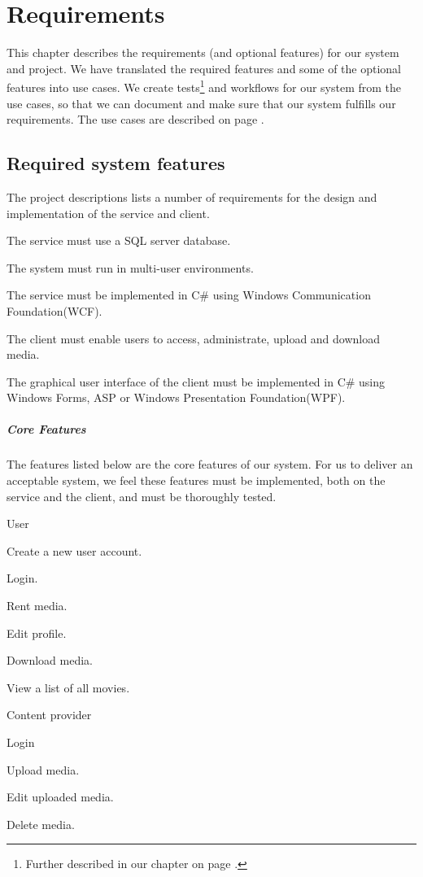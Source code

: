 \chapter{Requirements}
\label{Requirements}
This chapter describes the requirements (and optional features) for our system and project. We have translated the required features and some of the optional features into use cases. We create tests\footnote{Further described in our  chapter on page \pageref{Testing}.} and workflows for our system from the use cases, so that we can document and make sure that our system fulfills our requirements. The use cases are described on page \pageref{Requirements_UC}.

\section{Required system features}
\label{Requirements_Rfeatures}
The project descriptions lists a number of requirements for the design and implementation of the service and client.
\begin{my_itemize}
\item The service must use a SQL server database.
\item The system must run in multi-user environments.
\item The service must be implemented in C\# using Windows Communication Foundation(WCF).
\item The client must enable users to access, administrate, upload and download media.
\item The graphical user interface of the client must be implemented in C\# using Windows Forms, ASP or Windows Presentation Foundation(WPF).
\end{my_itemize}

\paragraph{Core Features}
The features listed below are the core features of our system. For us to deliver an acceptable system, we feel these features must be implemented, both on the service and the client, and must be thoroughly tested. 
\begin{my_itemize}
	\item User
	\begin{my_itemize}
		\item Create a new user account.
		\item Login.
		\item Rent media.
		\item Edit profile.
		\item Download media.
		\item View a list of all movies.
	\end{my_itemize}
	\item Content provider
	\begin{my_itemize}
		\item Login
		\item Upload media.
		\item Edit uploaded media.
		\item Delete media.
	\end{my_itemize}
\end{my_itemize}

